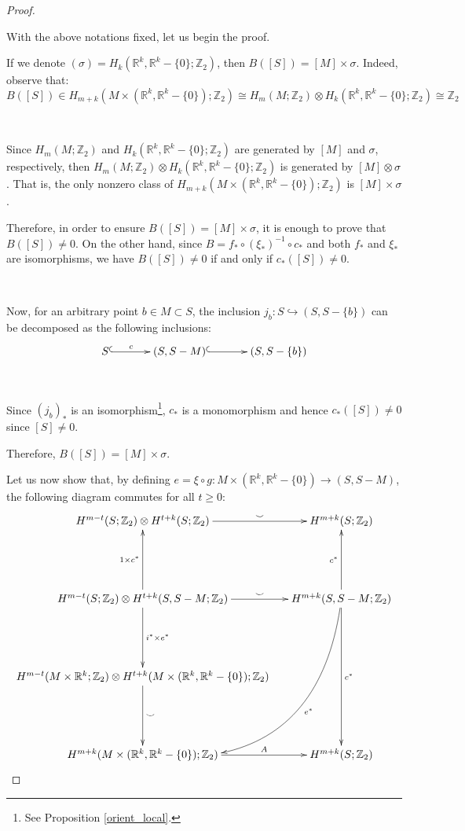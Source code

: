 \documentclass[12pt,oneside]{book}
\newcommand{\R}{\mathbb{R}}
\newcommand{\Z}{\mathbb{Z}}
\newcommand{\ccup}{\smile}
\newcommand{\tensor}{\otimes}
\begin{document}
\begin{proof}
        \
        
        With the above notations fixed, let us begin the proof.
        
        If we denote $(\sigma)=H_{k}(\R^{k},\R^{k}-\{0\};\Z_{2})$, then $B([S])=[M]\times\sigma$. Indeed, observe that:
        $$ B([S])\in H_{m+k}(M\times (\R^{k},\R^{k}-\{0\});\Z_{2})\cong H_{m}(M;\Z_{2})\tensor H_{k}(\R^{k},\R^{k}-\{0\};\Z_{2})\cong \Z_{2} $$
        
        \
        
        Since $H_{m}(M;\Z_{2})$ and $H_{k}(\R^{k},\R^{k}-\{0\};\Z_{2})$ are generated by $[M]$ and $\sigma$, respectively, then 
        $H_{m}(M;\Z_{2})\tensor H_{k}(\R^{k},\R^{k}-\{0\};\Z_{2})$ is generated by $[M]\tensor\sigma$. That is, the only nonzero class of 
        $H_{m+k}(M\times (\R^{k},\R^{k}-\{0\});\Z_{2})$ is $[M]\times\sigma$.
        
        Therefore, in order to ensure $B([S])=[M]\times\sigma$, it is enough to prove that $B([S])\neq 0$. On the other hand, since 
        $B=f_{*}\circ (\xi_{*})^{-1}\circ c_{*}$ and both $f_{*}$ and $\xi_{*}$ are isomorphisms, we have $B([S])\neq 0$ if and only if 
        $c_{*}([S])\neq 0$.

        \
        
        Now, for an arbitrary point $b\in M\subset S$, the inclusion $j_{b}:S\hookrightarrow (S,S-\{b\})$ can be decomposed as the following 
        inclusions:
        $$ \xymatrix @C=0.5cm {
        	S \ar@{^(->}[rr]^-{c} && (S,S-M) \ar@{^(->}[rr] && (S,S-\{b\})
        } $$

        \
        
        Since $(j_{b})_{*}$ is an isomorphism\footnote{See Proposition \ref{orient_local}.}, $c_{*}$ is a monomorphism and hence 
        $c_{*}([S])\neq 0$ since $[S]\neq 0$.
        
        Therefore, $B([S])=[M]\times\sigma$.
        
        Let us now show that, by defining $e=\xi\circ g:M\times (\R^{k},\R^{k}-\{0\})\to (S,S-M)$, the following diagram commutes for all 
        $t\geq 0$:
        $$ \xymatrix @C=0.5cm {
        	H^{m-t}(S;\Z_{2})\tensor H^{t+k}(S;\Z_{2}) \ar[r]^-{\ccup} & H^{m+k}(S;\Z_{2}) \\
        	& \\		 
        	H^{m-t}(S;\Z_{2})\tensor H^{t+k}(S,S-M;\Z_{2}) \ar[uu]^-{1\times c^{*}} \ar[r]^-{\ccup} \ar[dd]^-{i^{*}\times e^{*}} & H^{m+k}(S,S-M;\Z_{2}) \ar[uu]^-{c^{*}} \ar@/^2cm/[ldddd]^-{e^{*}} \ar[dddd]^-{c^{*}} \\
        	& \\				
        	H^{m-t}(M\times\R^{k};\Z_{2})\tensor H^{t+k}(M\times (\R^{k},\R^{k}-\{0\});\Z_{2}) \ar[dd]^-{\ccup} & \\
        	& \\	
        	H^{m+k}(M\times (\R^{k},\R^{k}-\{0\});\Z_{2}) \ar[r]^-{A} & H^{m+k}(S;\Z_{2})
        } $$


\end{proof}
\end{document}
